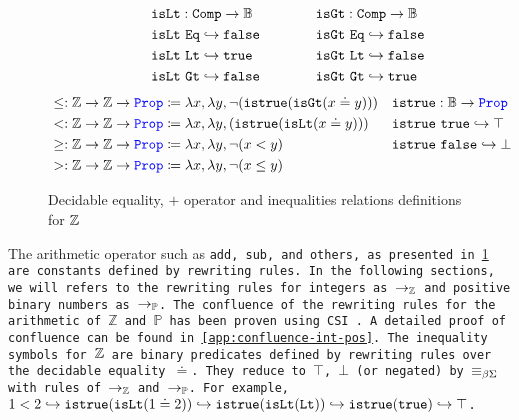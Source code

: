 \begin{figure}
\[\begin{array}{l@{\hspace{4em}}l@{\hspace{4em}}l}
&
\begin{aligned}
  &\tt{isLt} : \tt{Comp} \ra \bb{B} \\
  &\tt{isLt}~\tt{Eq} \re \tt{false} \\
  &\tt{isLt}~\tt{Lt} \re \tt{true} \\
  &\tt{isLt}~\tt{Gt} \re \tt{false} \\
\end{aligned}
&
\begin{aligned}
  &\tt{isGt} : \tt{Comp} \ra \bb{B} \\
  &\tt{isGt}~\tt{Eq} \re \tt{false} \\
  &\tt{isGt}~\tt{Lt} \re \tt{false} \\
  &\tt{isGt}~\tt{Gt} \re \tt{true} \\
\end{aligned}
\end{array}
\]
\noindent
\begin{align*}
&\leq: \bb{Z} \ra \bb{Z} \ra \prop  \coloneq \lambda x,\lambda y, \neg (\tt{istrue}(\tt{isGt}(x \doteq y))) & &\tt{istrue} : \bb{B} \ra \prop \\
&<: \bb{Z} \ra \bb{Z} \ra \prop  \coloneq \lambda x,\lambda y, (\tt{istrue}(\tt{isLt}(x \doteq y))) & &\tt{istrue}~\tt{true} \re \top \\
&\geq: \bb{Z} \ra \bb{Z} \ra \prop  \coloneq \lambda x,\lambda y, \neg (x < y) & &\tt{istrue}~\tt{false} \re \bot \\
&>: \bb{Z} \ra \bb{Z} \ra \prop  \coloneq \lambda x,\lambda y, \neg (x \leq y) & & \\
\end{align*}

\caption{Decidable equality, $+$ operator and inequalities relations definitions for $\bb{Z}$}
\label{fig:arith-ops}
\end{figure}

The arithmetic operator such as \tt{add}, \tt{sub}, and others, as presented in \cref{fig:arith-ops} are constants defined by rewriting rules. In the following sections, we will refers 
to the rewriting rules for integers as $\ra_\bb{Z}$ and positive binary numbers as $\ra_\bb{P}$.
The confluence of the rewriting rules for the arithmetic of $\mathbb{Z}$ and $\mathbb{P}$ has been proven using CSI \cite{CSI}. A detailed proof of confluence can be found in \cref{app:confluence-int-pos}.
The inequality symbols for $\bb{Z}$ are binary predicates defined by rewriting rules over the decidable equality $\doteq$. They reduce to $\top$, $\bot$ (or negated) by $\equivL$ with rules of $\ra_\bb{Z}$ and $\ra_\bb{P}$.
For example, $1 < 2 \hookrightarrow \tt{istrue}(\tt{isLt}(1 \doteq 2)) \hookrightarrow \tt{istrue}(\tt{isLt}(\tt{Lt})) \hookrightarrow \tt{istrue}(\tt{true}) \hookrightarrow \top$.

